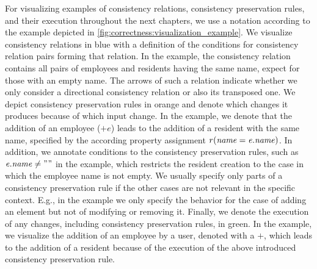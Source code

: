 For visualizing examples of consistency relations, consistency preservation rules, and their execution throughout the next chapters, we use a notation according to the example depicted in \autoref{fig:correctness:visualization_example}.
We visualize consistency relations in blue with a definition of the conditions for consistency relation pairs forming that relation.
In the example, the consistency relation contains all pairs of employees and residents having the same name, expect for those with an empty name.
The arrows of such a relation indicate whether we only consider a directional consistency relation or also its transposed one.
We depict consistency preservation rules in orange and denote which changes it produces because of which input change.
In the example, we denote that the addition of an employee ($+e$) leads to the addition of a resident with the same name, specified by the according property assignment $r(\mathit{name} = \mathit{e.name})$.
In addition, we annotate conditions to the consistency preservation rules, such as $\mathit{e.name} \neq ""$ in the example, which restricts the resident creation to the case in which the employee name is not empty.
We usually specify only parts of a consistency preservation rule if the other cases are not relevant in the specific context.
E.g., in the example we only specify the behavior for the case of adding an element but not of modifying or removing it.
Finally, we denote the execution of any changes, including consistency preservation rules, in green.
In the example, we visualize the addition of an employee by a user, denoted with a $+$, which leads to the addition of a resident because of the execution of the above introduced consistency preservation rule.




